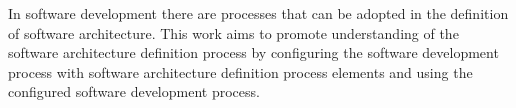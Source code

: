 In software development there are processes that can be adopted in the definition of software architecture. This work aims to promote understanding of the software architecture definition process by configuring the software development process with software architecture definition process elements and using the configured software development process.
